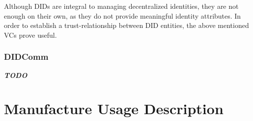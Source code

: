 Although DIDs are integral to managing decentralized identities, they are not enough on their own, as they do not
provide meaningful identity attributes. In order to establish a trust-relationship between DID entities, the above
mentioned VCs prove useful. \cite{w3c2019verifiablecredentials}

\subsubsection{DIDComm} %
\label{sec:DIDComm}
\textbf{\textit{TODO}}





\section{Manufacture Usage Description} %
\label{sec:Manufacture Usage Description}


